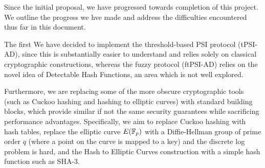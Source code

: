 

Since the initial proposal, we have progressed towards completion of this project. We outline the progress we hve made and address the difficulties encountered thus far in this document.

The first We have decided to implement the threshold-based PSI protocol (tPSI-AD), since this is substantially easier to understand and relies solely on classical cryptographic constructions, whereas the fuzzy protocol (ftPSI-AD) relies on the novel idea of Detectable Hash Functions, an area which is not well explored.

Furthermore, we are replacing some of the more obscure cryptographic tools (such as Cuckoo hashing and hashing to elliptic curves) with standard building blocks, which provide similar if not the same security guarantees while sacrificing performance advantages. Specifically, we aim to replace Cuckoo hashing with hash tables, replace the elliptic curve $E(\mathbb{F}_p)$ with a  Diffie-Hellman group of prime order $q$ (where a point on the curve is mapped to a key) and the discrete log problem is hard, and the Hash to Elliptic Curves construction with a simple hash function such as SHA-3.

